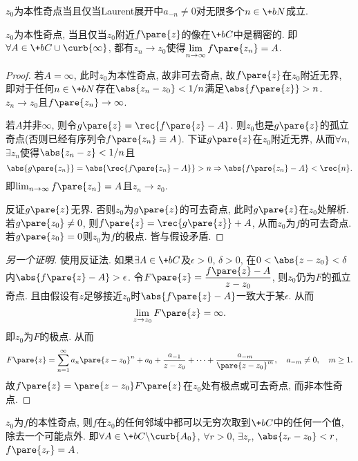 \documentclass[../ComplexVariable.tex]{subfiles}
\begin{document}
\begin{theorem}
    $z_0$为本性奇点当且仅当Laurent展开中$a_{-n}\neq 0$对无限多个$n\in \+bN$成立.
\end{theorem}
\begin{theorem}[Weierstra\ss]
    $z_0$为本性奇点, 当且仅当$z_0$附近$f\pare{z}$的像在$\+bC$中是稠密的. 即$\forall A \in \+bC\cup\curb{\infty}$, 都有$z_n\rightarrow z_0$使得$\displaystyle \lim_{n\rightarrow \infty} f\pare{z_n} = A$.
\end{theorem}
\begin{proof}
    若$A=\infty$, 此时$z_0$为本性奇点, 故非可去奇点, 故$f\pare{z}$在$z_0$附近无界, 即对于任何$n\in \+bN$存在$\abs{z_n - z_0}<1/n$满足$\abs{f\pare{z}} > {n}$. $z_n\rightarrow z_0$且$f\pare{z_n}\rightarrow \infty$.
    \par
    若$A$并非$\infty$, 则令$g\pare{z} = \displaystyle \rec{f\pare{z} - A}$. 则$z_0$也是$g\pare{z}$的孤立奇点(否则已经有序列令$f\pare{z_n}\equiv A$). 下证$g\pare{z}$在$z_0$附近无界, 从而$\forall n$, $\exists z_n$使得$\abs{z_n - z}<1/n$且
    \[ \abs{g\pare{z_n}} = \abs{\rec{f\pare{z_n} - A}} > n \Rightarrow \abs{f\pare{z_n} - A} < \rec{n}. \]
    即$\lim_{n\rightarrow \infty} f\pare{z_n} = A$且$z_n\rightarrow z_0$.
    \par
    反证$g\pare{z}$无界. 否则$z_0$为$g\pare{z}$的可去奇点, 此时$g\pare{z}$在$z_0$处解析. 若$g\pare{z_0}\neq 0$, 则$f\pare{z} = \displaystyle \rec{g\pare{z}} + A$, 从而$z_0$为$f$的可去奇点. 若$g\pare{z_0} = 0$则$z_0$为$f$的极点. 皆与假设矛盾.
\end{proof}
\begin{proof}[另一个证明]
    使用反证法. 如果$\exists A\in \+bC$及$\epsilon > 0$, $\delta > 0$, 在$0<\abs{z-z_0}<\delta$内$\abs{f\pare{z} - A} > \epsilon$. 令$F\pare{z} = \displaystyle \frac{f\pare{z} - A}{z-z_0}$, 则$z_0$仍为$F$的孤立奇点. 且由假设有$z$足够接近$z_0$时$\abs{f\pare{z} - A}$一致大于某$\epsilon$. 从而
    \[ \lim_{z\rightarrow z_0} F\pare{z} = \infty. \]
    即$z_0$为$F$的极点. 从而
    \[ F\pare{z} = \sum_{n=1}^\infty a_n\pare{z-z_0}^n + a_0 + \frac{a_{-1}}{z-z_0} + \cdots + \frac{a_{-m}}{\pare{z-z_0}^m},\quad a_{-m}\neq 0,\quad m\ge 1. \]
    故$f\pare{z} = \pare{z-z_0}F\pare{z}$在$z_0$处有极点或可去奇点, 而非本性奇点.
\end{proof}
\begin{theorem}[Picard大定理]
    $z_0$为$f$的本性奇点, 则$f$在$z_0$的任何邻域中都可以无穷次取到$\+bC$中的任何一个值, 除去一个可能点外. 即$\forall A \in \+bC\backslash\curb{A_0}$, $\forall r>0$, $\exists z_r$, $\abs{z_r - z_0}<r$, $f\pare{z_r} = A$.
\end{theorem}
\end{document}
